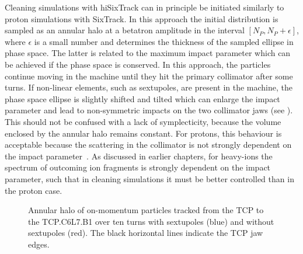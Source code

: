 Cleaning simulations with hiSixTrack can in principle be initiated similarly to proton simulations with SixTrack. In this approach the initial distribution is sampled as an annular halo at a betatron amplitude in the interval $[N_P, N_P+\epsilon]$, where $\epsilon$ is a small number and determines the thickness of the sampled ellipse in phase space. The latter is related to the maximum impact parameter which can be achieved if the phase space is conserved. In this approach, the particles continue moving in the machine until they hit the primary collimator after some turns. If non-linear elements, such as sextupoles, are present in the machine, the phase space ellipse is slightly shifted and tilted which can enlarge the impact parameter and lead to non-symmetric impacts on the two collimator jaws (see ). This should not be confused with a lack of symplecticity, because the volume enclosed by the annular halo remains constant. For protons, this behaviour is acceptable because the scattering in the collimator is not strongly dependent on the impact parameter~\cite{Bruce2014a}. As discussed in earlier chapters, for heavy-ions the spectrum of outcoming ion fragments is strongly dependent on the impact parameter, such that in cleaning simulations it must be better controlled than in the proton case.


\begin{figure}[htbp]
  \centering
  \caption{Annular halo of on-momentum particles tracked from the TCP to the TCP.C6L7.B1 over ten turns with sextupoles (blue) and without sextupoles (red). The black horizontal lines indicate the TCP jaw edges.}  
  \label{pic:16070603}
  \end{figure}

